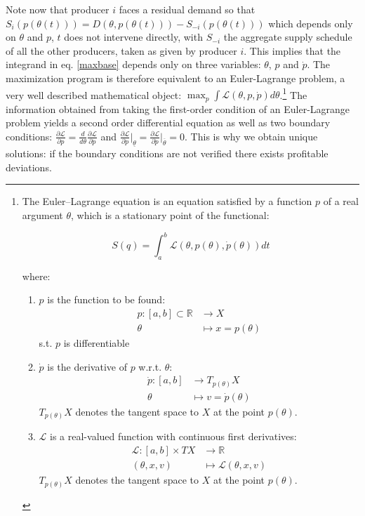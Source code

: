 Note now that producer $i$ faces a residual demand so that $S_i(p(\theta(t)))=D(\theta,p(\theta(t)))-S_{-i}(p(\theta(t)))$ which depends only on $\theta$ and $p$, $t$ does not intervene directly, with $S_{-i}$ the aggregate supply schedule of all the other producers, taken as given by producer $i$. This implies that the integrand in eq. \ref{maxbase} depends only on three variables: $\theta$, $p$ and $\dot{p}$.  The maximization program is therefore equivalent to an Euler-Lagrange problem, a very well described mathematical object: $\max_p\int\mathcal{L}(\theta,p,\dot{p})d\theta$.\footnote{The Euler–Lagrange equation is an equation satisfied by a function  $p$ of a real argument $\theta$, which is a stationary point of the functional:

$$ S(q) = \int_a^b \mathcal{L}(\theta,p(\theta),\dot{p}(\theta))dt$$

where:
\begin{enumerate}
\item $p$ is the function to be found:
\begin{align*}
p \colon [a,b] \subset \mathbb{R} &\to X\\
\theta & \mapsto x=p(\theta)
\end{align*}
s.t. $p$ is differentiable
\item $\dot{p}$ is the derivative of $p$ w.r.t. $\theta$:
\begin{align*}
\dot{p} \colon [a,b] &\to T_{p(\theta)}X\\
\theta & \mapsto v=\dot{p}(\theta)
\end{align*}
$T_{p(\theta)}X$ denotes the tangent space to $X$ at the point $p(\theta)$.
\item $\mathcal{L}$ is a real-valued function with continuous first derivatives:
\begin{align*}
\mathcal{L} \colon [a,b] \times TX &\to\mathbb{R}\\
(\theta,x,v) & \mapsto \mathcal{L}(\theta,x,v)
\end{align*}
$T_{p(\theta)}X$ denotes the tangent space to $X$ at the point $p(\theta)$.
\end{enumerate}
}
The information obtained from taking the first-order condition of an Euler-Lagrange problem yields a second order differential equation as well as two boundary conditions: $\frac{\partial\mathcal{L}}{\partial p}=\frac{d}{d\theta}\frac{\partial\mathcal{L}}{\partial \dot{p}}$ and $\frac{\partial\mathcal{L}}{\partial\dot{p}}\big|_{\underline{\theta}}=\frac{\partial\mathcal{L}}{\partial\dot{p}}\big|_{\overline{\theta}}=0$. This is why we obtain unique solutions: if the boundary conditions are not verified there exists profitable deviations. \\

